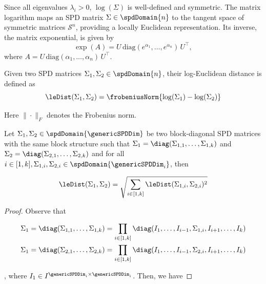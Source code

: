 \documentclass[pdflatex,sn-mathphys-num]{sn-jnl}%
\theoremstyle{thmstyleone}%
\theoremstyle{thmstyletwo}%
\theoremstyle{thmstylethree}%
\begin{document}
\begin{appendices}
\begin{remark}
Since all eigenvalues $\lambda_i > 0$, $\log(\Sigma)$ is well-defined and symmetric. 
The matrix logarithm maps an SPD matrix $\Sigma \in \spdDomain{n}$ to the tangent space of symmetric matrices $\mathcal{S}^n$, providing a locally Euclidean representation. 
Its inverse, the matrix exponential, is given by
\[
\exp(A) = U\,\mathrm{diag}(e^{\alpha_1}, \ldots, e^{\alpha_n})\,U^\top,
\]
where $A = U\,\mathrm{diag}(\alpha_1,\ldots,\alpha_n)\,U^\top$.
\end{remark}


\begin{definition}\label{def:le_distance}
Given two SPD matrices $\Sigma_1, \Sigma_2 \in \spdDomain{n}$, 
their log-Euclidean distance is defined as
\[
\leDist(\Sigma_1, \Sigma_2) = \frobeniusNorm{\log(\Sigma_1) - \log(\Sigma_2)}
\]

Here $\| \cdot \|_F$ denotes the Frobenius norm. 

\end{definition}



\begin{prop}\label{prop:block_diag_le}
Let $\Sigma_1, \Sigma_2 \in \spdDomain{\genericSPDDim}$ be two block-diagonal SPD matrices with the same block structure such that $\Sigma_1 = \diag(\Sigma_{1,1}, \dots, \Sigma_{1,k})$ and $\Sigma_2 = \diag(\Sigma_{2,1}, \dots, \Sigma_{2,k})$ and 
for all $i \in [1,k], \Sigma_{1, i}, \Sigma_{2,i} \in \spdDomain{\genericSPDDim_i}$, then  

\begin{eqnarray*}
\leDist(\Sigma_1, \Sigma_2) = \sqrt{\sum\limits_{i \in [1,k]} \leDist(\Sigma_{1,i}, \Sigma_{2,i} )^2}
\end{eqnarray*}
\end{prop}

\begin{proof}
    Observe that

    \begin{align*}
    & \Sigma_1 = \diag(\Sigma_{1,1}, \dots, \Sigma_{1,k}) = \prod\limits_{i \in [1, k]} \diag(I_1, \dots, I_{i-1}, \Sigma_{1, i}, I_{i+1}, \dots, I_k) \\
    & \Sigma_1 = \diag(\Sigma_{2,1}, \dots, \Sigma_{2,k}) = \prod\limits_{i \in [1, k]} \diag(I_1, \dots, I_{i-1}, \Sigma_{2, i}, I_{i+1}, \dots, I_k) 
    \end{align*}

    , where $I_{1} \in I^{\genericSPDDim_i \times \genericSPDDim_i}$. Then, we have 


\end{proof}
\end{appendices}
\end{document}
